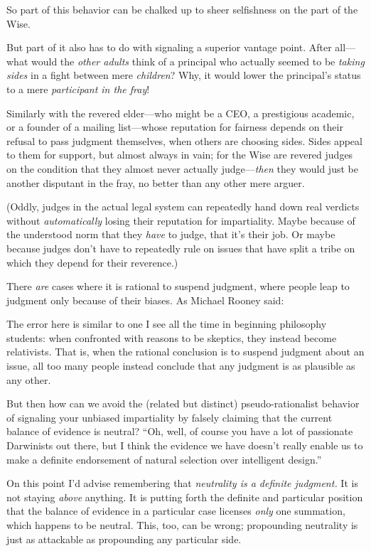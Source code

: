 {
 So part of this behavior can be chalked up to sheer selfishness on
the part of the Wise.}

{
 But part of it also has to do with signaling a superior vantage
point. After all---what would the \textit{other adults} think of a
principal who actually seemed to be \textit{taking sides} in a fight
between mere \textit{children}? Why, it would lower the
principal's status to a mere \textit{participant in the
fray}!}

{
 Similarly with the revered elder---who might be a CEO, a
prestigious academic, or a founder of a mailing list---whose reputation
for fairness depends on their refusal to pass judgment themselves, when
others are choosing sides. Sides appeal to them for support, but almost
always in vain; for the Wise are revered judges on the condition that
they almost never actually judge---\textit{then} they would just be
another disputant in the fray, no better than any other mere arguer.}

{
 (Oddly, judges in the actual legal system can repeatedly hand down
real verdicts without \textit{automatically} losing their reputation
for impartiality. Maybe because of the understood norm that they
\textit{have} to judge, that it's their job. Or maybe
because judges don't have to repeatedly rule on issues
that have split a tribe on which they depend for their reverence.)}

{
 There \textit{are} cases where it is rational to suspend judgment,
where people leap to judgment only because of their biases. As Michael
Rooney said:}

{
 The error here is similar to one I see all the time in beginning
philosophy students: when confronted with reasons to be skeptics, they
instead become relativists. That is, when the rational conclusion is to
suspend judgment about an issue, all too many people instead conclude
that any judgment is as plausible as any other.}

{
 But then how can we avoid the (related but distinct)
pseudo-rationalist behavior of signaling your unbiased impartiality by
falsely claiming that the current balance of evidence is neutral?
``Oh, well, of course you have a lot of passionate
Darwinists out there, but I think the evidence we have
doesn't really enable us to make a definite endorsement
of natural selection over intelligent design.''}

{
 On this point I'd advise remembering that
\textit{neutrality is a definite judgment.} It is not staying
\textit{above} anything. It is putting forth the definite and
particular position that the balance of evidence in a particular case
licenses \textit{only} one summation, which happens to be neutral.
This, too, can be wrong; propounding neutrality is just as attackable
as propounding any particular side.}

